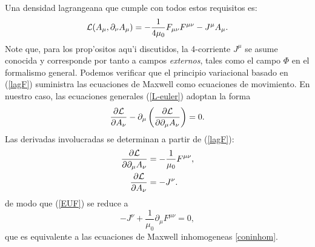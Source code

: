 Una densidad lagrangeana que cumple con todos estos requisitos es:
\begin{equation}
{\cal L}(A_\mu,\partial_\nu A_\mu) =-\frac{1}{4\mu_0}F_{\mu\nu}F^{\mu\nu}-J^\mu A_\mu .\label{lagF}
\end{equation}
Note que, para los prop'ositos aqu'i discutidos, la 4-corriente $J^\mu$ se asume
conocida y corresponde por tanto a campos \textit{externos}, tales como el campo
$\Phi$ en el formalismo general. Podemos verificar que el principio variacional
basado en (\ref{lagF}) suministra las ecuaciones de Maxwell como ecuaciones de
movimiento. En nuestro caso, las ecuaciones generales (\ref{L-euler}) adoptan la
forma
\begin{equation}
\frac{\partial{\cal L}}{\partial A_{\nu}}-\partial_\mu\left(  \frac
{\partial{\cal L}}{\partial\partial_\mu A_{\nu}}\right) =0. \label{EUF}
\end{equation}
Las derivadas involucradas se determinan a partir de (\ref{lagF}):
\begin{align}
\frac{\partial{\cal L}}{\partial\partial_\mu A_{\nu}}  & =-\frac{1}{\mu_0}F^{\mu\nu}, \label{dLdda}\\
\frac{\partial{\cal L}}{\partial A_{\nu}}  & =-J^\nu .
\end{align}
de modo que (\ref{EUF}) se reduce a
\begin{equation}
-J^\nu +\frac{1}{\mu_0}\partial_\mu F^{\mu\nu}=0,
\end{equation}
que es equivalente a las ecuaciones de Maxwell inhomogeneas \eqref{coninhom}.

